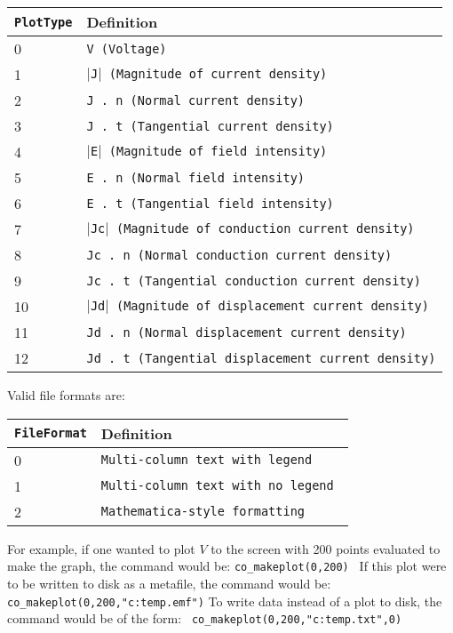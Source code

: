 \begin{itemize}
\begin{tabular}{ll}
\texttt{PlotType} &  Definition \\ \hline
 0 & \texttt{V (Voltage)} \\
 1 & \texttt{$\vert$J$\vert$ (Magnitude of current density)} \\
 2 & \texttt{J . n (Normal current density)} \\
 3 & \texttt{J . t (Tangential current density)} \\
 4 & \texttt{$\vert$E$\vert$ (Magnitude of field intensity)} \\
 5 & \texttt{E . n (Normal field intensity)} \\
 6 & \texttt{E . t (Tangential field intensity)} \\
 7 & \texttt{$\vert$Jc$\vert$ (Magnitude of conduction current density)} \\
 8 & \texttt{Jc . n (Normal conduction current density)} \\
 9 & \texttt{Jc . t (Tangential conduction current density)} \\
 10 & \texttt{$\vert$Jd$\vert$ (Magnitude of displacement current density)} \\
 11 & \texttt{Jd . n (Normal displacement current density)} \\
 12 & \texttt{Jd . t (Tangential displacement current density)} \\
\end{tabular}

\vspace*{8pt}
Valid file formats are:

\begin{tabular}{ll}
\texttt{FileFormat} &  Definition  \\ \hline
 0 & \texttt{Multi-column text with legend } \\
 1 & \texttt{Multi-column text with no legend } \\
 2 & \texttt{Mathematica-style formatting}
\end{tabular}

For example, if one wanted to plot $V $ to the screen with 200 points evaluated
to make the graph, the command would be: \newline
\texttt{co\_makeplot(0,200) } \newline
If this plot were to be written to disk as a metafile, the command
would be:\texttt{ } \newline
\texttt{co\_makeplot(0,200,"c:temp.emf")} \newline
To write data instead of a plot to disk, the command would be of
the form:\texttt{ } \newline
\texttt{co\_makeplot(0,200,"c:temp.txt",0)} \newline



\end{itemize}
